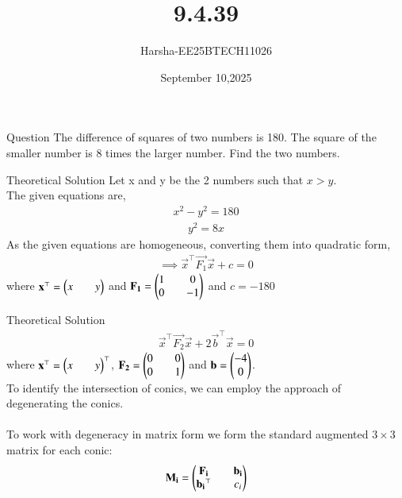 \documentclass{beamer}
\title %
{9.4.39}
\date{September 10,2025}
\author %
{Harsha-EE25BTECH11026}
\begin{document}
\frame{\titlepage}


\begin{frame}{Question}
The difference of squares of two numbers is 180. The square of the smaller number is 8 times the larger number. Find the two numbers.
\end{frame}

\begin{frame}{Theoretical Solution}
Let x and y be the 2 numbers such that $x>y$.\\
The given equations are,
\begin{align}
    x^2-y^2=180
\end{align}
\begin{align}
    y^2=8x
\end{align}
As the given equations are homogeneous, converting them into quadratic form,
\begin{align}
    \implies \vec{x}^{\top}\vec{F_1}\vec{x}+c=0
\end{align}
where $\mathbf{x}^{\top}=\begin{pmatrix}x&&y\end{pmatrix}$ and $\mathbf{F_1}=\begin{pmatrix}1&&0\\0&&-1\end{pmatrix}$ and $c=-180$\\
\end{frame}

\begin{frame}{Theoretical Solution}
\begin{align}
    \vec{x}^{\top}\vec{F_2}\vec{x}+2\vec{b}^{\top}\vec{x}=0
\end{align}
where $\mathbf{x}^{\top}=\begin{pmatrix}x&&y\end{pmatrix}^{\top}$, $\mathbf{F_2}=\begin{pmatrix}0&&0\\0&&1\end{pmatrix}$ and $\mathbf{b}=\begin{pmatrix}-4\\0\end{pmatrix}$.\\
To identify the intersection of conics, we can employ the approach of degenerating the conics.\\
\\
To work with degeneracy in matrix form we form the standard augmented $3 \times 3$ matrix for each conic:
\begin{align}
    \mathbf{M_i}=\begin{pmatrix}\mathbf{F_i}&&\mathbf{b_i}\\\mathbf{b_i}^{\top}&&c_i\end{pmatrix}
\end{align}
\end{frame}
\end{document}
